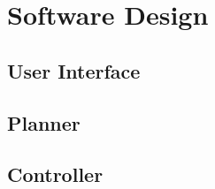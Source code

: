 \section{Software Design}

\subsection{User Interface}

\subsection{Planner}

\subsection{Controller}
